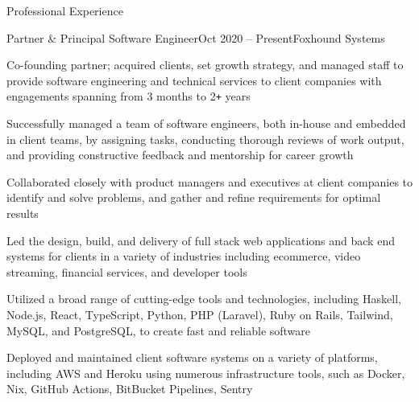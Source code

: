 \documentclass{resume} %
\def\plus{\texttt{+}}
\begin{document}

\begin{rSection}{Professional Experience}

\begin{rSubsection}{Partner \& Principal Software Engineer}{Oct 2020 -- Present}{Foxhound Systems}{}
\item Co-founding partner; acquired clients, set growth strategy, and managed staff to provide software engineering and technical services to client companies with engagements spanning from 3 months to 2{\plus} years
  \item Successfully managed a team of software engineers, both in-house and embedded in client teams, by assigning tasks, conducting thorough reviews of work output, and providing constructive feedback and mentorship for career growth
  \item Collaborated closely with product managers and executives at client companies to identify and solve problems, and gather and refine requirements for optimal results
  \item Led the design, build, and delivery of full stack web applications and back end systems for clients in a variety of industries including ecommerce, video streaming, financial services, and developer tools
  \item Utilized a broad range of cutting-edge tools and technologies, including Haskell, Node.js, React, TypeScript, Python, PHP (Laravel), Ruby on Rails, Tailwind, MySQL, and PostgreSQL, to create fast and reliable software
  \item Deployed and maintained client software systems on a variety of platforms, including AWS and Heroku using numerous infrastructure tools, such as Docker, Nix, GitHub Actions, BitBucket Pipelines, Sentry
\end{rSubsection}



\end{rSection}
\end{document}
